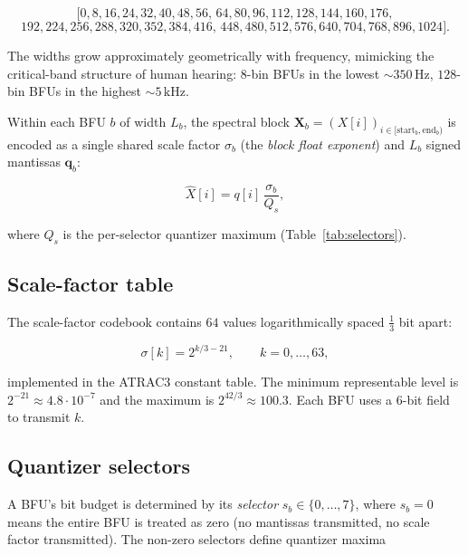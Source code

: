 \documentclass[11pt]{article}
\begin{document}
\begin{small}
\[
[0, 8, 16, 24, 32, 40, 48, 56,\,
   64, 80, 96, 112, 128, 144, 160, 176,
\]
\[
   192, 224, 256, 288, 320, 352, 384, 416,\,
   448, 480, 512, 576, 640, 704, 768, 896, 1024].
\]
\end{small}

\noindent
The widths grow approximately geometrically with frequency, mimicking the
critical-band structure of human hearing: \(8\)-bin BFUs in the lowest
\(\sim\!350\,\text{Hz}\), \(128\)-bin BFUs in the highest \(\sim\!5\,\text{kHz}\).

Within each BFU \(b\) of width \(L_b\), the spectral block
\(\mathbf{X}_b = (X[i])_{i \in [\text{start}_b,\text{end}_b)}\) is encoded as a
single shared scale factor \(\sigma_b\) (the \emph{block float exponent}) and
\(L_b\) signed mantissas \(\mathbf{q}_b\):

\begin{equation}
    \widehat{X}[i] = q[i]\,\frac{\sigma_b}{Q_s},
\end{equation}

\noindent
where \(Q_s\) is the per-selector quantizer maximum (Table~\ref{tab:selectors}).

\subsection{Scale-factor table}

The scale-factor codebook contains \(64\) values logarithmically spaced
\(\tfrac{1}{3}\) bit apart:

\begin{equation}
    \sigma[k] = 2^{k/3 - 21},\qquad k = 0,\dots,63,
\end{equation}

\noindent
implemented in the ATRAC3 constant table. The minimum representable level is
\(2^{-21}\!\approx\!4.8\!\cdot\!10^{-7}\) and the maximum is
\(2^{42/3}\!\approx\!100.3\). Each BFU uses a \(6\)-bit field to transmit \(k\).

\subsection{Quantizer selectors}

A BFU's bit budget is determined by its \emph{selector} \(s_b \in \{0,\dots,7\}\),
where \(s_b = 0\) means the entire BFU is treated as zero (no mantissas
transmitted, no scale factor transmitted). The non-zero selectors define
quantizer maxima
\end{document}
